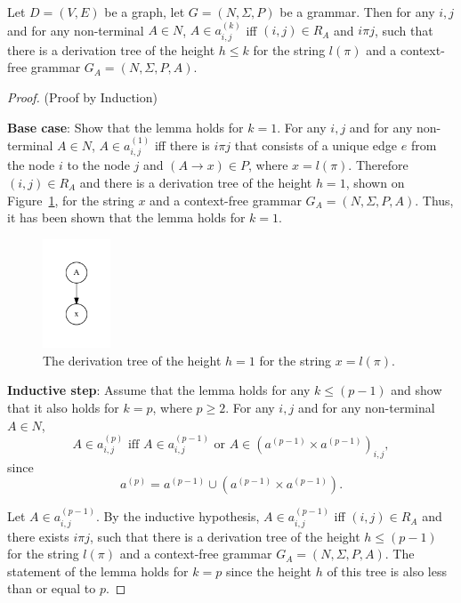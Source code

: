 \begin{lemma}\label{lemma:cf}
Let $D = (V,E)$ be a graph, let $G =(N,\Sigma,P)$ be a grammar. Then for any $i, j$ and for any non-terminal $A \in N$, $A \in a^{(k)}_{i,j}$ iff $(i,j) \in R_A$ and $i \pi j$, such that there is a derivation tree of the height $h \leq k$ for the string $l(\pi)$ and a context-free grammar $G_A = (N,\Sigma,P,A)$.
\end{lemma}
\begin{proof}(Proof by Induction)

\textbf{Base case}: Show that the lemma holds for $k = 1$. For any $i, j$ and for any non-terminal $A \in N$, $A \in a^{(1)}_{i,j}$ iff there is $i \pi j$ that consists of a unique edge $e$ from the node $i$ to the node $j$ and $(A \rightarrow x) \in P$, where $x = l(\pi)$. Therefore $(i,j) \in R_A$ and there is a derivation tree of the height $h = 1$, shown on Figure~\ref{tree1}, for the string $x$ and a context-free grammar $G_A = (N,\Sigma,P,A)$. Thus, it has been shown that the lemma holds for $k = 1$.

\begin{figure}[h!]
 \centering
 \includegraphics[width=2cm]{pictures/tree1.pdf}
 \caption{The derivation tree of the height $h = 1$ for the string $x = l(\pi)$.}
 \label{tree1}
\end{figure}

\textbf{Inductive step}: Assume that the lemma holds for any $k \leq (p - 1)$ and show that it also holds for $k = p$, where $p \geq 2$. For any $i, j$ and for any non-terminal $A \in N$, $$A \in a^{(p)}_{i,j} \text{ iff } A \in a^{(p-1)}_{i,j} \text{ or } A \in (a^{(p-1)} \times a^{(p-1)})_{i,j},$$ since $$a^{(p)} = a^{(p-1)} \cup (a^{(p-1)} \times a^{(p-1)}).$$

Let $A \in a^{(p-1)}_{i,j}$. By the inductive hypothesis, $A \in a^{(p-1)}_{i,j}$ iff $(i,j) \in R_A$ and there exists $i \pi j$, such that there is a derivation tree of the height $h \leq (p-1)$ for the string $l(\pi)$ and a context-free grammar $G_A = (N,\Sigma,P,A)$. The statement of the lemma holds for $k = p$ since the height $h$ of this tree is also less than or equal to $p$.


\end{proof}
